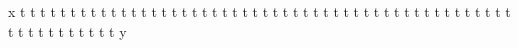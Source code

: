 \documentclass{article}
\begin{document}
x\clearpage
t\clearpage
t\clearpage
t\clearpage
t\clearpage
t\clearpage
t\clearpage
t\clearpage
t\clearpage
t\clearpage
t\clearpage
t\clearpage
t\clearpage
t\clearpage
t\clearpage
t\clearpage
t\clearpage
t\clearpage
t\clearpage
t\clearpage
t\clearpage
t\clearpage
t\clearpage
t\clearpage
t\clearpage
t\clearpage
t\clearpage
t\clearpage
t\clearpage
t\clearpage
t\clearpage
t\clearpage
t\clearpage
t\clearpage
t\clearpage
t\clearpage
t\clearpage
t\clearpage
t\clearpage
t\clearpage
t\clearpage
t\clearpage
t\clearpage
t\clearpage
t\clearpage
t\clearpage
t\clearpage
t\clearpage
t\clearpage
t\clearpage
t\clearpage
t\clearpage
t\clearpage
t\clearpage
t\clearpage
t\clearpage
t\clearpage
t\clearpage
t\clearpage
t\clearpage
t\clearpage
y\gdef\SatexReachedEnd{}
\end{document}
